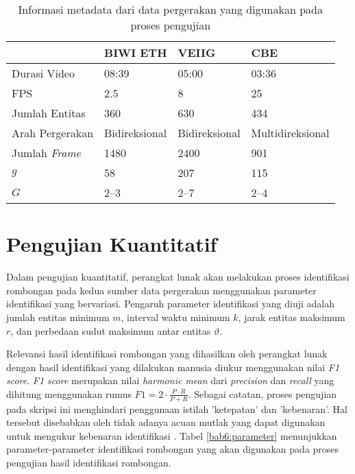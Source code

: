 \begin{table}[h]
    \centering
    \caption[Metadata sumber data pergerakan]{Informasi metadata dari data pergerakan yang digunakan pada proses pengujian}
    \begin{tabular}{p{3cm} p{2.5cm} p{2.5cm} p{3cm}}
        \hline
        & \textbf{BIWI ETH} & \textbf{VEIIG} & \textbf{CBE} \\
        \hline
        Durasi Video & 08:39 & 05:00 & 03:36 \\
        FPS & 2.5 & 8 & 25 \\
        Jumlah Entitas & 360 & 630 & 434 \\
        Arah Pergerakan & Bidireksional & Bidireksional & Multidireksional \\
        Jumlah \textit{Frame} & 1480 & 2400 & 901 \\
        $g$ & 58 & 207 & 115 \\
        $G$ & 2--3 & 2--7 & 2--4 \\
        \hline
    \end{tabular}
    \label{bab6:metadata-pergerakan}
\end{table}

\section{Pengujian Kuantitatif}
\label{sec:quantitative}

Dalam pengujian kuantitatif, perangkat lunak akan melakukan proses identifikasi rombongan pada kedua sumber data pergerakan menggunakan parameter identifikasi yang bervariasi. Pengaruh parameter identifikasi yang diuji adalah jumlah entitas minimum $m$, interval waktu minimum $k$, jarak entitas maksimum $r$, dan perbedaan sudut maksimum antar entitas $\vartheta$. 

Relevansi hasil identifikasi rombongan yang dihasilkan oleh perangkat lunak dengan hasil identifikasi yang dilakukan manusia diukur menggunakan nilai \textit{F1 score}. \textit{F1 score} merupakan nilai \textit{harmonic mean} dari \textit{precision} dan \textit{recall} yang dihitung menggunakan rumus $F1 = 2 \cdot \frac{P \cdot R}{P + R}$. Sebagai catatan, proses pengujian pada skripsi ini menghindari penggunaan istilah 'ketepatan' dan 'kebenaran'. Hal tersebut disebabkan oleh tidak adanya acuan mutlak yang dapat digunakan untuk mengukur kebenaran identifikasi \cite{wiratma:software}. Tabel \ref{bab6:parameter} menunjukkan parameter-parameter identifikasi rombongan yang akan digunakan pada proses pengujian hasil identifikasi rombongan.

